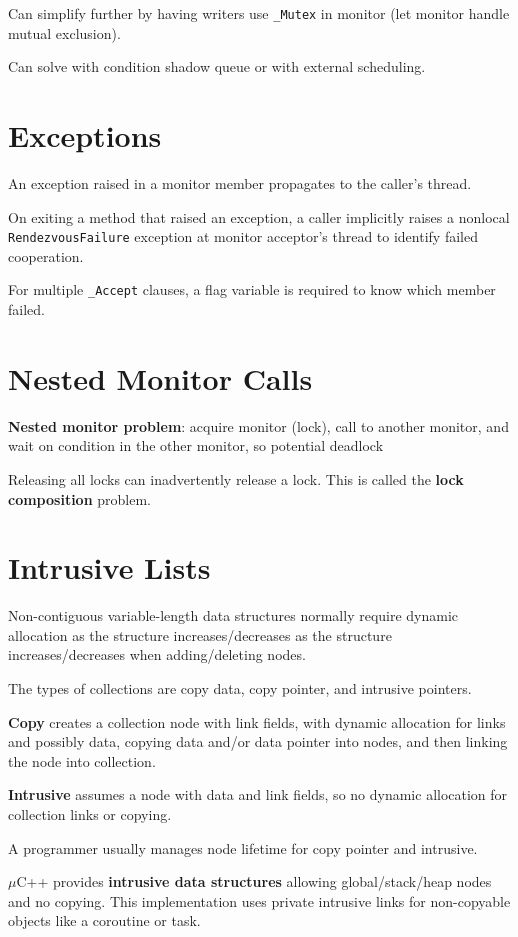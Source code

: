 \documentclass[11pt]{article}
\begin{document}
Can simplify further by having writers use \texttt{\_Mutex} in monitor (let monitor handle mutual exclusion).

Can solve with condition shadow queue or with external scheduling.
\section{Exceptions}
\label{sec:org08255fd}
An exception raised in a monitor member propagates to the caller's thread.

On exiting a method that raised an exception, a caller implicitly raises a nonlocal \texttt{RendezvousFailure}
exception at monitor acceptor's thread to identify failed cooperation.

For multiple \texttt{\_Accept} clauses, a flag variable is required to know which member failed.
\section{Nested Monitor Calls}
\label{sec:orgcc246d1}
\textbf{Nested monitor problem}: acquire monitor (lock), call to another monitor, and wait on condition in the
other monitor, so potential deadlock

Releasing all locks can inadvertently release a lock.
This is called the \textbf{lock composition} problem.
\section{Intrusive Lists}
\label{sec:orgf66ecc8}
Non-contiguous variable-length data structures normally require dynamic allocation as the structure
increases/decreases as the structure increases/decreases when adding/deleting nodes.

The types of collections are copy data, copy pointer, and intrusive pointers.

\textbf{Copy} creates a collection node with link fields, with dynamic allocation for links and possibly data,
copying data and/or data pointer into nodes, and then linking the node into collection.

\textbf{Intrusive} assumes a node with data and link fields, so no dynamic allocation for collection links or
copying.

A programmer usually manages node lifetime for copy pointer and intrusive.

\(\mu\)C++ provides \textbf{intrusive data structures} allowing global/stack/heap nodes and no copying.
This implementation uses private intrusive links for non-copyable objects like a coroutine or task.
\end{document}
